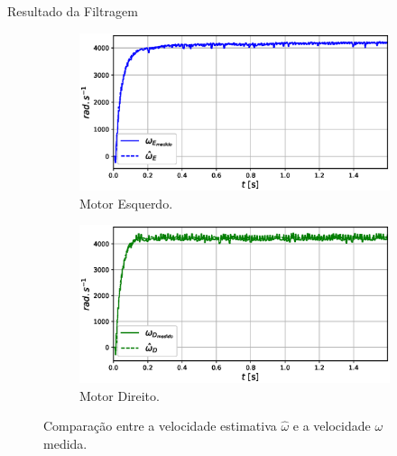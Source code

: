 \begin{frame}{Resultado da Filtragem}

    \begin{figure}
        \begin{subfigure}{.48\textwidth}
            \centering
            \includegraphics[width=1.15\textwidth]{figuras/resultados/exp03/filtro_vs_sem_filtro_esquerdo100.eps}
            \caption{Motor Esquerdo.}
        \end{subfigure}
        \begin{subfigure}{.48\textwidth}
            \centering
            \includegraphics[width=1.15\textwidth]{figuras/resultados/exp03/filtro_vs_sem_filtro_direito100.eps}
            \caption{Motor Direito.}
        \end{subfigure}
        \caption{Comparação entre a velocidade estimativa $\hat{\omega}$ e a velocidade $\omega$ medida.}
    \end{figure}
    
\end{frame}


